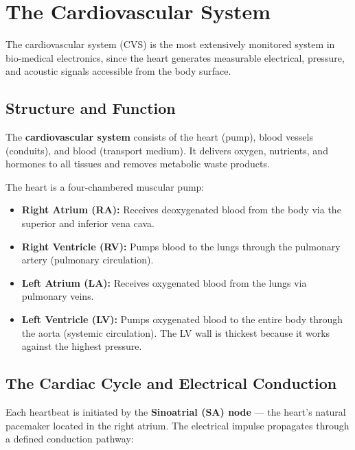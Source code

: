 \documentclass[12pt,a4paper]{article}
\begin{document}
\section{The Cardiovascular System}

The cardiovascular system (CVS) is the most extensively monitored system in bio-medical electronics, since the heart generates measurable electrical, pressure, and acoustic signals accessible from the body surface.

\subsection{Structure and Function}

\begin{tcolorbox}[defbox, title={\textbf{Definition: Cardiovascular System}}]
The \textbf{cardiovascular system} consists of the heart (pump), blood vessels (conduits), and blood (transport medium). It delivers oxygen, nutrients, and hormones to all tissues and removes metabolic waste products.
\end{tcolorbox}

The heart is a four-chambered muscular pump:
\begin{itemize}[leftmargin=*, itemsep=3pt]
  \item \textbf{Right Atrium (RA):} Receives deoxygenated blood from the body via the superior and inferior vena cava.
  \item \textbf{Right Ventricle (RV):} Pumps blood to the lungs through the pulmonary artery (pulmonary circulation).
  \item \textbf{Left Atrium (LA):} Receives oxygenated blood from the lungs via pulmonary veins.
  \item \textbf{Left Ventricle (LV):} Pumps oxygenated blood to the entire body through the aorta (systemic circulation). The LV wall is thickest because it works against the highest pressure.
\end{itemize}

\subsection{The Cardiac Cycle and Electrical Conduction}

Each heartbeat is initiated by the \textbf{Sinoatrial (SA) node} --- the heart's natural pacemaker located in the right atrium. The electrical impulse propagates through a defined conduction pathway:
\end{document}
